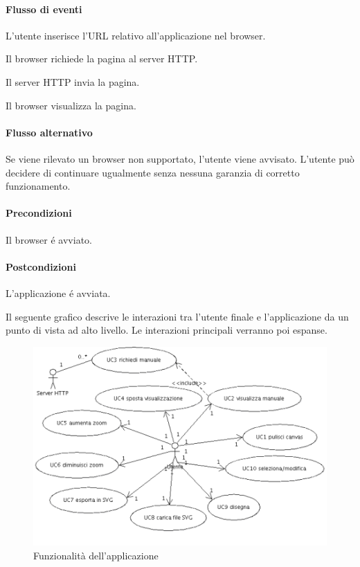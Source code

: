 \paragraph{Flusso di eventi}
\begin{elenconumerato}[\textbf{}]{\subsubsecindent}
\item L'utente inserisce l'URL relativo all'applicazione nel browser.
\item Il browser richiede la pagina al server HTTP.
\item Il server HTTP invia la pagina.
\item Il browser visualizza la pagina.
\end{elenconumerato}
\paragraph{Flusso alternativo}
Se viene rilevato un browser non supportato, l'utente viene avvisato. L'utente pu\`o decidere di continuare ugualmente senza nessuna garanzia di corretto funzionamento.
\paragraph{Precondizioni} Il browser \'e avviato.
\paragraph{Postcondizioni} L'applicazione \'e avviata.

Il seguente grafico descrive le interazioni tra l'utente finale e l'applicazione da un punto di vista ad alto livello. Le interazioni principali verranno poi espanse.
\begin{figure}[!ht]
\centering
\vspace{20pt} 
\includegraphics{UCInterazione.png}
\caption{Funzionalit\`a dell'applicazione}
\end{figure}

